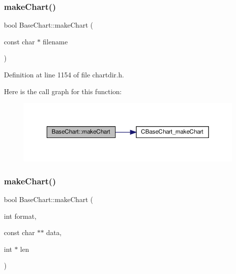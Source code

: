 \subsubsection{\texorpdfstring{make\+Chart()}{makeChart()}\hspace{0.1cm}{\footnotesize\ttfamily [1/4]}}
{\footnotesize\ttfamily bool Base\+Chart\+::make\+Chart (\begin{DoxyParamCaption}\item[{const char $\ast$}]{filename }\end{DoxyParamCaption})\hspace{0.3cm}{\ttfamily [inline]}}



Definition at line 1154 of file chartdir.\+h.

Here is the call graph for this function\+:
\nopagebreak
\begin{figure}[H]
\begin{center}
\leavevmode
\includegraphics[width=350pt]{class_base_chart_aa5c1afc94d6cc856f3d34b886e88748a_cgraph}
\end{center}
\end{figure}
\mbox{\label{class_base_chart_a7b18e9ce35315e1cdbe3f829896b2ba7}} 
\subsubsection{\texorpdfstring{make\+Chart()}{makeChart()}\hspace{0.1cm}{\footnotesize\ttfamily [2/4]}}
{\footnotesize\ttfamily bool Base\+Chart\+::make\+Chart (\begin{DoxyParamCaption}\item[{int}]{format,  }\item[{const char $\ast$$\ast$}]{data,  }\item[{int $\ast$}]{len }\end{DoxyParamCaption})\hspace{0.3cm}{\ttfamily [inline]}}



